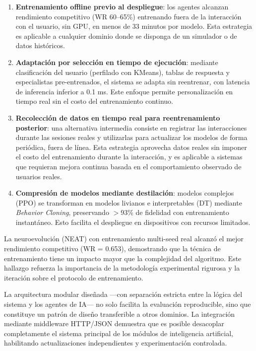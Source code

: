\begin{enumerate}
    \item \textbf{Entrenamiento offline previo al despliegue}: los agentes alcanzan rendimiento competitivo (WR 60--65\%) entrenando fuera de la interacción con el usuario, sin GPU, en menos de 33 minutos por modelo. Esta estrategia es aplicable a cualquier dominio donde se disponga de un simulador o de datos históricos.

    \item \textbf{Adaptación por selección en tiempo de ejecución}: mediante clasificación del usuario (perfilado con KMeans), tablas de respuesta y especialistas pre-entrenados, el sistema se adapta sin reentrenar, con latencia de inferencia inferior a 0.1 ms. Este enfoque permite personalización en tiempo real sin el costo del entrenamiento continuo.

    \item \textbf{Recolección de datos en tiempo real para reentrenamiento posterior}: una alternativa intermedia consiste en registrar las interacciones durante las sesiones reales y utilizarlas para actualizar los modelos de forma periódica, fuera de línea. Esta estrategia aprovecha datos reales sin imponer el costo del entrenamiento durante la interacción, y es aplicable a sistemas que requieran mejora continua basada en el comportamiento observado de usuarios reales.

    \item \textbf{Compresión de modelos mediante destilación}: modelos complejos (PPO) se transforman en modelos livianos e interpretables (DT) mediante \textit{Behavior Cloning}, preservando $>$93\% de fidelidad con entrenamiento instantáneo. Esto facilita el despliegue en dispositivos con recursos limitados.
\end{enumerate}

La neuroevolución (NEAT) con entrenamiento multi-seed real alcanzó el mejor rendimiento competitivo (WR = 0.653), demostrando que la técnica de entrenamiento tiene un impacto mayor que la complejidad del algoritmo. Este hallazgo refuerza la importancia de la metodología experimental rigurosa y la iteración sobre el protocolo de entrenamiento.

La arquitectura modular diseñada ---con separación estricta entre la lógica del sistema y los agentes de IA--- no solo facilita la evaluación reproducible, sino que constituye un patrón de diseño transferible a otros dominios. La integración mediante middleware HTTP/JSON demuestra que es posible desacoplar completamente el sistema principal de los módulos de inteligencia artificial, habilitando actualizaciones independientes y experimentación controlada.

